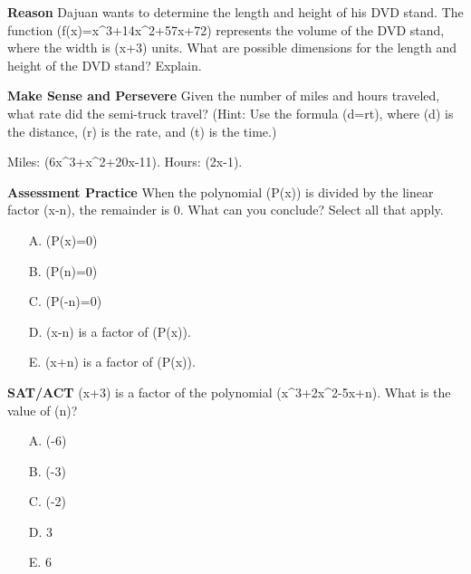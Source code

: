 \documentclass{article}
\newenvironment{practice}[2]{}{}        %
\newcommand{\answer}[1]{}               %
\newcommand{\placeholder}[2]{}          %
\begin{document}
\begin{practice}{34}{3}
\textbf{Reason} Dajuan wants to determine the length and height of his DVD stand. The function (f(x)=x^3+14x^2+57x+72) represents the volume of the DVD stand, where the width is (x+3) units. What are possible dimensions for the length and height of the DVD stand? Explain.
\answer{Use synthetic division to divide (x^3+14x^2+57x+72) by (x+3). The quotient is (x^2+11x+24). Factor (x^2+11x+24) to get ((x+3)(x+8)). So, (x+3) and (x+8) are possible dimensions for the length and height of the DVD stand.}
\end{practice}
\begin{practice}{35}{2}
\textbf{Make Sense and Persevere} Given the number of miles and hours traveled, what rate did the semi-truck travel? (Hint: Use the formula (d=rt), where (d) is the distance, (r) is the rate, and (t) is the time.)
\placeholder{illustration}{Semi-truck; Miles (6x cubed plus x squared plus 20x minus 11); Hours (2x minus 1)}
Miles: (6x^3+x^2+20x-11). Hours: (2x-1).
\answer{(3x^2+2x+11) mi/h}
\end{practice}
\begin{practice}{36}{1}
\textbf{Assessment Practice} When the polynomial (P(x)) is divided by the linear factor (x-n), the remainder is 0. What can you conclude? Select all that apply.
\begin{enumerate}
\item[A.] (P(x)=0)
\item[B.] (P(n)=0)
\item[C.] (P(-n)=0)
\item[D.] (x-n) is a factor of (P(x)).
\item[E.] (x+n) is a factor of (P(x)).
\end{enumerate}
\answer{B, D}
\end{practice}
\begin{practice}{37}{2}
\textbf{SAT/ACT} (x+3) is a factor of the polynomial (x^3+2x^2-5x+n). What is the value of (n)?
\begin{enumerate}
\item[A.] (-6)
\item[B.] (-3)
\item[C.] (-2)
\item[D.] 3
\item[E.] 6
\end{enumerate}
\answer{A}
\end{practice}
\end{document}
